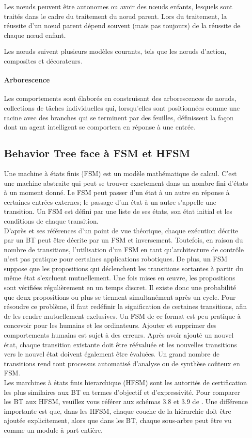 \documentclass[titlepage]{article}
\begin{document}
		Les nœuds peuvent être autonomes ou avoir des nœuds enfants, lesquels sont traités dans le cadre du traitement du nœud parent. Lors du traitement, la réussite d'un nœud parent dépend souvent (mais pas toujours) de la réussite de chaque nœud enfant.
		
		Les nœuds suivent plusieurs modèles courants, tels que les nœuds d'action, composites et décorateurs. \cite{documentation_aws}
		
		\paragraph{Arborescence}
		Les comportements sont élaborés en construisant des arborescences de nœuds, collections de tâches individuelles qui, lorsqu'elles sont positionnées comme une racine avec des branches qui se terminent par des feuilles, définissent la façon dont un agent intelligent se comportera en réponse à une entrée. \cite{documentation_aws}	
		\subsection{Behavior Tree face à FSM et HFSM}
		Une machine à états finis (FSM) est un modèle mathématique de calcul. C'est une machine abstraite qui peut se trouver exactement dans un nombre fini d'états à un moment donné. Le FSM peut passer d'un état à un autre en réponse à certaines entrées externes; le passage d'un état à un autre s'appelle une transition. Un FSM est défini par une liste de ses états, son état initial et les conditions de chaque transition. \cite{wikipedia_FSM}
		\\
		D'après \cite{colledanchise_2017} et ses références d'un point de vue théorique, chaque exécution décrite par un BT peut être décrite par un FSM et inversement. Toutefois, en raison du nombre de transitions, l'utilisation d'un FSM en tant qu'architecture de contrôle n'est pas pratique pour certaines applications robotiques. De plus, un FSM suppose que les propositions qui déclenchent les transitions sortantes à partir du même état s’excluent mutuellement. Une fois mises en œuvre, les propositions sont vérifiées régulièrement en un temps discret. Il existe donc une probabilité que deux propositions ou plus se tiennent simultanément après un cycle. Pour résoudre ce problème, il faut redéfinir la signification de certaines transitions, afin de les rendre mutuellement exclusives. Un FSM de ce format est peu pratique à concevoir pour les humains et les ordinateurs. Ajouter et supprimer des comportements humains est sujet à des erreurs. Après avoir ajouté un nouvel état, chaque transition existante doit être réévaluée et les nouvelles transitions vers le nouvel état doivent également être évaluées. Un grand nombre de transitions rend tout processus automatisé d'analyse ou de synthèse coûteux en FSM.
		\\
		Les marchines à états finis hierarchique (HFSM) sont les autorités de certification les plus similaires aux BT en termes d'objectif et d'expressivité. Pour comparer les BT aux HFSM, veuillez vous référer aux schémas 3.8 et 3.9 de \cite{colledanchise_2017}. Une différence importante est que, dans les HFSM, chaque couche de la hiérarchie doit être ajoutée explicitement, alors que dans les BT, chaque sous-arbre peut être vu comme un module à part entière.
\end{document}
